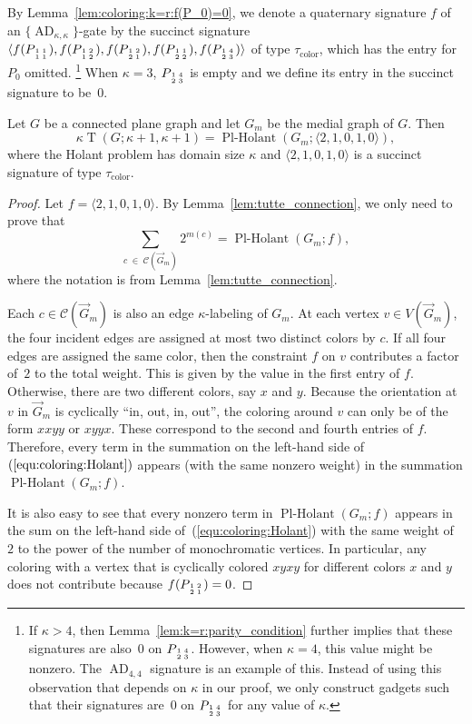 \documentclass[11pt]{article}
\newcommand{\PlHolant}{\operatorname{Pl-Holant}}
\newcommand{\AD}{\operatorname{AD}}
\newcommand{\subMat}[4]{\mbox{\scriptsize $\begin{smallmatrix} #1 & #4 \\ #2 & #3 \end{smallmatrix}$}}
\begin{document}
By Lemma~\ref{lem:coloring:k=r:f(P_0)=0},
we denote a quaternary signature $f$ of an $\{\AD_{\kappa,\kappa}\}$-gate by the succinct signature
$\langle
 f(P_{\subMat{1}{1}{1}{1}}),
 f(P_{\subMat{1}{1}{2}{2}}),
 f(P_{\subMat{1}{2}{1}{2}}),
 f(P_{\subMat{1}{2}{2}{1}}),
 f(P_{\subMat{1}{2}{3}{4}})
\rangle$ of type $\tau_\text{color}$,
which has the entry for $P_0$ omitted.%
\footnote{If $\kappa > 4$,
then Lemma~\ref{lem:k=r:parity_condition} further implies that these signatures are also~0 on $P_{\subMat{1}{2}{3}{4}}$.
However, when $\kappa = 4$, this value might be nonzero. The $\AD_{4,4}$ signature is an example of this.
Instead of using this observation that depends on $\kappa$ in our proof,
we only construct gadgets such that their signatures are~$0$ on $P_{\subMat{1}{2}{3}{4}}$ for any value of $\kappa$.}
When $\kappa = 3$,
$P_{\subMat{1}{2}{3}{4}}$ is empty and we define its entry in the succinct signature to be~$0$.

\begin{lemma} \label{lem:holant_connection}
 Let $G$ be a connected plane graph and let $G_m$ be the medial graph of $G$.
 Then
 \[
  \kappa \operatorname{T}(G; \kappa+1, \kappa+1) = \PlHolant(G_m; \langle 2,1,0,1,0 \rangle),
 \]
 where the Holant problem has domain size $\kappa$ and $\langle 2,1,0,1,0 \rangle$ is a succinct signature of type $\tau_\text{color}$.
\end{lemma}

\begin{proof}
 Let $f = \langle 2,1,0,1,0 \rangle$.
 By Lemma~\ref{lem:tutte_connection}, we only need to prove that
 \begin{equation} \label{equ:coloring:Holant}
  \sum_{c\; \in\; \mathcal{C}(\vec{G}_m)} 2^{m(c)} = \PlHolant(G_m; f),
 \end{equation}
 where the notation is from Lemma~\ref{lem:tutte_connection}.

 Each $c \in \mathcal{C}(\vec{G}_m)$ is also an edge $\kappa$-labeling of $G_m$.
 At each vertex $v \in V(\vec{G}_m)$,
 the four incident edges are assigned at most two distinct colors by $c$.
 If all four edges are assigned the same color,
 then the constraint $f$ on $v$ contributes a factor of~$2$ to the total weight.
 This is given by the value in the first entry of $f$.
 Otherwise, there are two different colors, say $x$ and $y$.
 Because the orientation at $v$ in $\vec{G}_m$ is cyclically ``in, out, in, out'',
 the coloring around $v$ can only be of the form $xxyy$ or $xyyx$.
 These correspond to the second and fourth entries of $f$.
 Therefore, every term in the summation on the left-hand side of~$(\ref{equ:coloring:Holant})$ appears (with the same nonzero weight) in the summation $\PlHolant(G_m; f)$.

 It is also easy to see that every nonzero term in $\PlHolant(G_m; f)$ appears in the sum on the left-hand side of~(\ref{equ:coloring:Holant})
 with the same weight of~$2$ to the power of the number of monochromatic vertices.
 In particular,
 any coloring with a vertex that is cyclically colored $xyxy$ for different colors $x$ and $y$ does not contribute because $f(P_{\subMat{1}{2}{1}{2}}) = 0$.
\end{proof}
\end{document}

